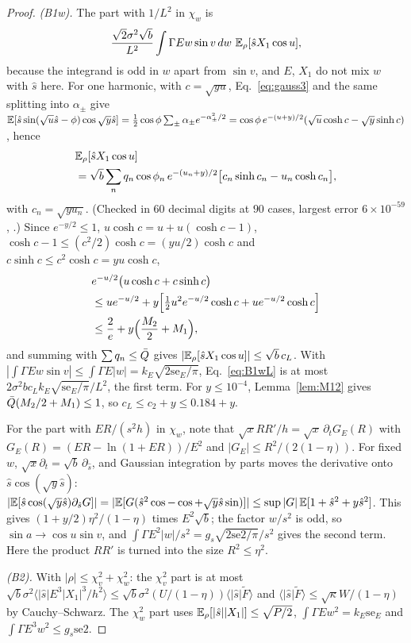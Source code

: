 \begin{proof}
\emph{(B1w).} The part with $1/L^2$ in $\chi_w$ is
\begin{equation}
\frac{\sqrt2\sigma^2\sqrt b}{L^2}\int\Gamma Ew\sin v\,dw\ \mathbb{E}_\rho[\hat sX_1\cos u],
\label{eq:B1wL}
\end{equation}
because the integrand is odd in $w$ apart from $\sin v$, and $E$, $X_1$ do not mix $w$ with $\hat s$ here.
For one harmonic, with $c=\sqrt{yu}$, Eq.~\eqref{eq:gauss3} and the same splitting into $\alpha_\pm$ give $\mathbb{E}[\hat s\sin(\sqrt u\hat s-\phi)\cos\sqrt y\hat s]=\frac12\cos\phi\sum_\pm\alpha_\pm e^{-\alpha_\pm^2/2}=\cos\phi\,e^{-(u+y)/2}(\sqrt u\cosh c-\sqrt y\sinh c)$, hence
\begin{equation}
\begin{split}
&\mathbb{E}_\rho[\hat sX_1\cos u]\\&=\sqrt b\sum_nq_n\cos\phi_n\,e^{-(u_n+y)/2}\bigl[c_n\sinh c_n-u_n\cosh c_n\bigr],
\end{split}
\label{eq:cL}
\end{equation}
with $c_n=\sqrt{yu_n}$.
(Checked in $60$ decimal digits at $90$ cases, largest error $6\times10^{-59}$, .)
Since $e^{-y/2}\le1$, $u\cosh c=u+u(\cosh c-1)$, $\cosh c-1\le(c^2/2)\cosh c=(yu/2)\cosh c$ and $c\sinh c\le c^2\cosh c=yu\cosh c$,
\begin{equation}
\begin{split}
&e^{-u/2}\bigl(u\cosh c+c\sinh c\bigr)\\&\le ue^{-u/2}+y\Bigl[\tfrac12u^2e^{-u/2}\cosh c+ue^{-u/2}\cosh c\Bigr]\\&\le\frac2e+y\Bigl(\frac{M_2}2+M_1\Bigr),
\end{split}
\end{equation}
and summing with $\sum q_n\le\bar Q$ gives $|\mathbb{E}_\rho[\hat sX_1\cos u]|\le\sqrt b\,c_L$.
With $|\int\Gamma Ew\sin v|\le\int\Gamma E|w|=k_E\sqrt{2\mathrm{se}_E/\pi}$, Eq.~\eqref{eq:B1wL} is at most $2\sigma^2bc_Lk_E\sqrt{\mathrm{se}_E/\pi}/L^2$, the first term.
For $y\le10^{-4}$, Lemma~\ref{lem:M12} gives $\bar Q(M_2/2+M_1)\le1$, so $c_L\le c_2+y\le0.184+y$.

For the part with $ER/(s^2h)$ in $\chi_w$, note that $\sqrt xRR'/h=\sqrt x\,\partial_tG_E(R)$ with $G_E(R)=(ER-\ln(1+ER))/E^2$ and $|G_E|\le R^2/(2(1-\eta))$.
For fixed $w$, $\sqrt x\partial_t=\sqrt b\,\partial_{\hat s}$, and Gaussian integration by parts moves the derivative onto $\hat s\cos(\sqrt y\hat s)$: $|\mathbb{E}[\hat s\cos(\sqrt y\hat s)\partial_{\hat s}G]|=|\mathbb{E}[G(\hat s^2\cos-\cos+\sqrt y\hat s\sin)]|\le\sup|G|\,\mathbb{E}[1+\hat s^2+y\hat s^2]$.
This gives $(1+y/2)\eta^2/(1-\eta)$ times $E^2\sqrt b$; the factor $w/s^2$ is odd, so $\sin a\to\cos u\sin v$, and $\int\Gamma E^2|w|/s^2=g_s\sqrt{2\mathrm{se2}/\pi}/s^2$ gives the second term.
Here the product $RR'$ is turned into the size $R^2\le\eta^2$.

\emph{(B2).} With $|\rho|\le\chi_v^2+\chi_w^2$: the $\chi_v^2$ part is at most $\sqrt b\sigma^2\langle|\hat s|E^3|X_1|^3/h^2\rangle\le\sqrt b\sigma^2(U/(1-\eta))\langle|\hat s|\tilde F\rangle$ and $\langle|\hat s|\tilde F\rangle\le\sqrt\kappa W/(1-\eta)$ by Cauchy--Schwarz. The $\chi_w^2$ part uses $\mathbb{E}_\rho[|\hat s||X_1|]\le\sqrt{P/2}$, $\int\Gamma Ew^2=k_E\mathrm{se}_E$ and $\int\Gamma E^3w^2\le g_s\mathrm{se2}$.
\end{proof}

